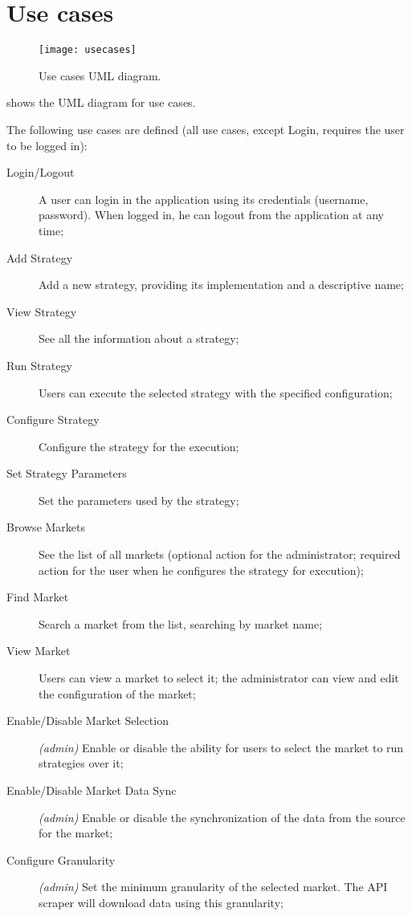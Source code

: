 \chapter{Use cases}\label{ch:usecases}

\begin{figure}[p]
	\texttt{[image: usecases]}
	\caption{Use cases UML diagram.}\label{fig:usecases}
\end{figure}

 shows the UML diagram for use cases.

The following use cases are defined (all use cases, except Login, requires the
user to be logged in):
\begin{description}
	\item[Login/Logout] A user can login in the application using its
		credentials (username, password). When logged in, he can logout
		from the application at any time;
	\item[Add Strategy] Add a new strategy, providing its implementation and
		a descriptive name;
	\item[View Strategy] See all the information about a strategy;
	\item[Run Strategy] Users can execute the selected strategy with the
		specified configuration;
	\item[Configure Strategy] Configure the strategy for the execution;
	\item[Set Strategy Parameters] Set the parameters used by the strategy;
	\item[Browse Markets] See the list of all markets (optional action for
		the administrator; required action for the user when he
		configures the strategy for execution);
	\item[Find Market] Search a market from the list, searching by market
		name;
	\item[View Market] Users can view a market to select it; the
		administrator can view and edit the configuration of the market;
	\item[Enable/Disable Market Selection] \textit{(admin)} Enable or
		disable the ability for users to select the market to run
		strategies over it;
	\item[Enable/Disable Market Data Sync] \textit{(admin)} Enable or
		disable the synchronization of the data from the source for the
		market;
	\item[Configure Granularity] \textit{(admin)} Set the minimum
		granularity of the selected market. The API scraper will
		download data using this granularity;

\end{description}
